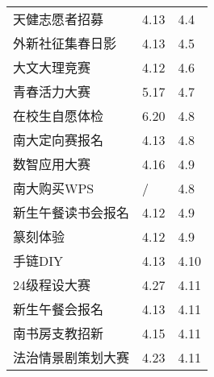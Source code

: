 \documentclass[letterpaper, 12pt]{article}
\begin{document}
\begin{multicols}{2}
{\begin{longtable}{|>{\centering\arraybackslash}m{}|m{}|m{}|}
    天健志愿者招募 & 4.13 & 4.4\\
    外新社征集春日影 & 4.13 & 4.5\\
    大文大理竞赛 & 4.12 & 4.6\\
    青春活力大赛 & 5.17 & 4.7\\
    在校生自愿体检 & 6.20 & 4.8\\
    南大定向赛报名 & 4.13 & 4.8\\
    数智应用大赛 & 4.16 & 4.9\\
    南大购买WPS & / & 4.8\\
    新生午餐读书会报名 & 4.12 & 4.9\\
    篆刻体验 & 4.12 & 4.9\\
    手链DIY & 4.13 & 4.10\\
    24级程设大赛 & 4.27 & 4.11\\
    新生午餐会报名 & 4.13 & 4.11\\
    南书房支教招新 & 4.15 & 4.11\\
    法治情景剧策划大赛 & 4.23 & 4.11\\
    
    \hline
\end{longtable}
\unskip
\unpenalty
\unpenalty}\unvbox\colbbox
\end{multicols}
\end{document}
